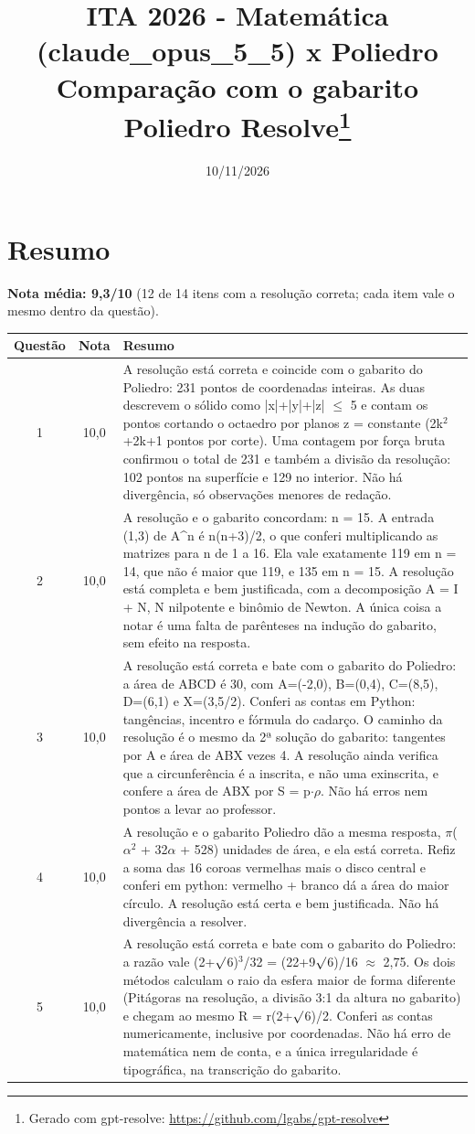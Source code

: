 \documentclass{article}%
\title{ITA 2026 {-} Matemática (claude\_opus\_5\_5) x Poliedro\\[4pt]\large Comparação com o gabarito Poliedro Resolve\thanks{Gerado com gpt-resolve: \url{https://github.com/lgabs/gpt-resolve}}}%
\date{10/11/2026}%
\begin{document}
%
\normalsize%
\maketitle%
\section*{Resumo}\textbf{Nota média: 9,3/10} (12 de 14 itens com a resolução correta; cada item vale o mesmo dentro da questão).\par\medskip%
\begin{longtable}{@{}c c p{}@{}}\toprule Questão & Nota & Resumo \\ \midrule
1 & 10,0 & A resolução está correta e coincide com o gabarito do Poliedro: 231 pontos de coordenadas inteiras. As duas descrevem o sólido como |x|+|y|+|z| $\leq$ 5 e contam os pontos cortando o octaedro por planos z = constante (2k$^2$+2k+1 pontos por corte). Uma contagem por força bruta confirmou o total de 231 e também a divisão da resolução: 102 pontos na superfície e 129 no interior. Não há divergência, só observações menores de redação. \\
2 & 10,0 & A resolução e o gabarito concordam: n = 15. A entrada (1,3) de A\^{}n é n(n+3)/2, o que conferi multiplicando as matrizes para n de 1 a 16. Ela vale exatamente 119 em n = 14, que não é maior que 119, e 135 em n = 15. A resolução está completa e bem justificada, com a decomposição A = I + N, N nilpotente e binômio de Newton. A única coisa a notar é uma falta de parênteses na indução do gabarito, sem efeito na resposta. \\
3 & 10,0 & A resolução está correta e bate com o gabarito do Poliedro: a área de ABCD é 30, com A=(-2,0), B=(0,4), C=(8,5), D=(6,1) e X=(3,5/2). Conferi as contas em Python: tangências, incentro e fórmula do cadarço. O caminho da resolução é o mesmo da 2ª solução do gabarito: tangentes por A e área de ABX vezes 4. A resolução ainda verifica que a circunferência é a inscrita, e não uma exinscrita, e confere a área de ABX por S = p$\cdot$$\rho$. Não há erros nem pontos a levar ao professor. \\
4 & 10,0 & A resolução e o gabarito Poliedro dão a mesma resposta, $\pi$($\alpha$$^2$ + 32$\alpha$ + 528) unidades de área, e ela está correta. Refiz a soma das 16 coroas vermelhas mais o disco central e conferi em python: vermelho + branco dá a área do maior círculo. A resolução está certa e bem justificada. Não há divergência a resolver. \\
5 & 10,0 & A resolução está correta e bate com o gabarito do Poliedro: a razão vale (2+$\surd$6)$^3$/32 = (22+9$\surd$6)/16 $\approx$ 2,75. Os dois métodos calculam o raio da esfera maior de forma diferente (Pitágoras na resolução, a divisão 3:1 da altura no gabarito) e chegam ao mesmo R = r(2+$\surd$6)/2. Conferi as contas numericamente, inclusive por coordenadas. Não há erro de matemática nem de conta, e a única irregularidade é tipográfica, na transcrição do gabarito. \\

\end{longtable}
\end{document}
